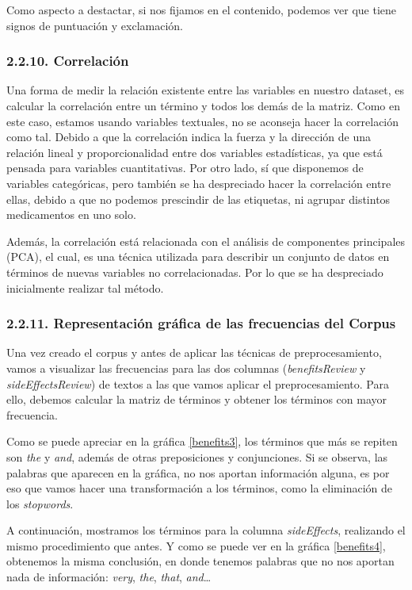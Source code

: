 \documentclass[spanish,]{article}
\begin{document}
Como aspecto a destactar, si nos fijamos en el contenido, podemos ver
que tiene signos de puntuación y exclamación.

\subsubsection{2.2.10. Correlación}\label{correlacion}

Una forma de medir la relación existente entre las variables en nuestro
dataset, es calcular la correlación entre un término y todos los demás
de la matriz. Como en este caso, estamos usando variables textuales, no
se aconseja hacer la correlación como tal. Debido a que la correlación
indica la fuerza y la dirección de una relación lineal y
proporcionalidad entre dos variables estadísticas, ya que está pensada
para variables cuantitativas. Por otro lado, sí que disponemos de
variables categóricas, pero también se ha despreciado hacer la
correlación entre ellas, debido a que no podemos prescindir de las
etiquetas, ni agrupar distintos medicamentos en uno solo.

Además, la correlación está relacionada con el análisis de componentes
principales (PCA), el cual, es una técnica utilizada para describir un
conjunto de datos en términos de nuevas variables no correlacionadas.
Por lo que se ha despreciado inicialmente realizar tal método.

\subsubsection{2.2.11. Representación gráfica de las frecuencias del
Corpus}\label{representacion-grafica-de-las-frecuencias-del-corpus}

Una vez creado el corpus y antes de aplicar las técnicas de
preprocesamiento, vamos a visualizar las frecuencias para las dos
columnas (\emph{benefitsReview} y \emph{sideEffectsReview}) de textos a
las que vamos aplicar el preprocesamiento. Para ello, debemos calcular
la matriz de términos y obtener los términos con mayor frecuencia.

Como se puede apreciar en la gráfica \ref{benefits3}, los términos que
más se repiten son \emph{the} y \emph{and}, además de otras
preposiciones y conjunciones. Si se observa, las palabras que aparecen
en la gráfica, no nos aportan información alguna, es por eso que vamos
hacer una transformación a los términos, como la eliminación de los
\emph{stopwords}.

A continuación, mostramos los términos para la columna
\emph{sideEffects}, realizando el mismo procedimiento que antes. Y como
se puede ver en la gráfica \ref{benefits4}, obtenemos la misma
conclusión, en donde tenemos palabras que no nos aportan nada de
información: \emph{very}, \emph{the}, \emph{that}, \emph{and}\ldots{}
\end{document}
